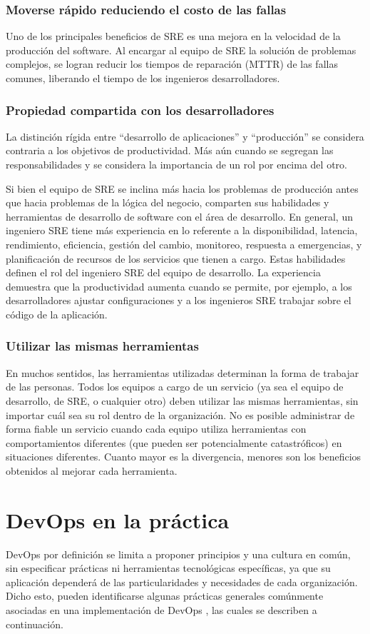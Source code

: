 \subsubsection{Moverse rápido reduciendo el costo de las fallas}
%
Uno de los principales beneficios de SRE es una mejora en la velocidad
de la producción del software. Al encargar al equipo de SRE la
solución de problemas complejos, se logran reducir los tiempos de
reparación (MTTR) de las fallas comunes, liberando el tiempo de los
ingenieros desarrolladores.
%
\subsubsection{Propiedad compartida con los desarrolladores}
%
La distinción rígida entre ``desarrollo de aplicaciones'' y
``producción'' se considera contraria a los objetivos de
productividad. Más aún cuando se segregan las responsabilidades y se
considera la importancia de un rol por encima del otro.

Si bien el equipo de SRE se inclina más hacia los problemas de
producción antes que hacia problemas de la lógica del negocio,
comparten sus habilidades y herramientas de desarrollo de software con
el área de desarrollo. En general, un ingeniero SRE tiene más
experiencia en lo referente a la disponibilidad, latencia,
rendimiento, eficiencia, gestión del cambio, monitoreo, respuesta a
emergencias, y planificación de recursos de los servicios que tienen a
cargo. Estas habilidades definen el rol del ingeniero SRE 
del equipo de desarrollo. La experiencia demuestra que la
productividad aumenta cuando se permite, por ejemplo, a los
desarrolladores ajustar configuraciones y a los ingenieros SRE
trabajar sobre el código de la aplicación.
%
\subsubsection{Utilizar las mismas herramientas}
%
En muchos sentidos, las herramientas utilizadas determinan la forma de
trabajar de las personas. Todos los equipos a cargo de un servicio (ya
sea el equipo de desarrollo, de SRE, o cualquier otro) deben utilizar
las mismas herramientas, sin importar cuál sea su rol dentro de la
organización. No es posible administrar de forma fiable un servicio
cuando cada equipo utiliza herramientas con comportamientos diferentes
(que pueden ser potencialmente catastróficos) en situaciones
diferentes. Cuanto mayor es la divergencia, menores son los beneficios
obtenidos al mejorar cada herramienta.
%
%
\section{DevOps en la práctica}
%
DevOps por definición se limita a proponer principios y una cultura en
común, sin especificar prácticas ni herramientas tecnológicas
específicas, ya que su aplicación dependerá de las particularidades y
necesidades de cada organización. Dicho esto, pueden identificarse
algunas prácticas generales comúnmente asociadas en una implementación
de DevOps \cite{awsdevops}, las cuales se describen a continuación.
%
